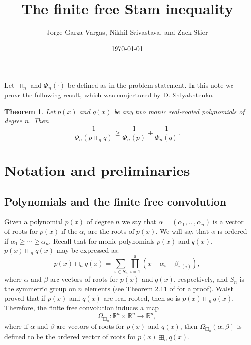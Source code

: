 \documentclass[12pt]{amsart}
\title{The finite free Stam inequality}
\author{Jorge Garza Vargas, Nikhil Srivastava, and  Zack Stier}
\date{\today}
\newcommand{\bR}{\mathbb{R}}
\newcommand{\roots}{\Omega_{\boxplus_n}}
\begin{document}
\maketitle


\newtheorem{theorem}{Theorem}[section]
\newtheorem{definition}{Definition}[section]
\newtheorem{conjecture}{Conjecture}[section]
\newtheorem{lemma}{Lemma}[section]
\newtheorem{corollary}{Corollary}[section]
\newtheorem{proposition}{Proposition}[section]
\newtheorem{observation}[theorem]{Observation}
\newtheorem{remark}{Remark}[section]
\newtheorem{problem}[theorem]{Problem}
\newtheorem{assumption}[theorem]{Assumption}
\newtheorem{claim}[theorem]{Claim}
\newtheorem{fact}[theorem]{Fact}
\newtheorem{example}[theorem]{Example}

\maketitle

Let $\boxplus_n$ and $\Phi_n(\cdot)$ be defined as in the problem statement.
In this note we prove the following result, which was conjectured by D. Shlyakhtenko.
\begin{theorem}
\label{thm:stamineq}
    Let $p(x)$ and $q(x)$ be any two monic real-rooted polynomials of degree $n$. Then 
    $$\frac{1}{\Phi_n(p\boxplus_n q)} \geq  \frac{1}{\Phi_n(p)} + \frac{1}{\Phi_n(q)}.$$
\end{theorem}

\section{Notation and preliminaries}
\subsection{Polynomials and the finite free convolution}

Given a polynomial $p(x)$ of degree $n$ we say that $\alpha=(\alpha_1, \dots, \alpha_n)$ is a vector of roots for $p(x)$ if the $\alpha_i$ are the roots of $p(x)$. We will say that $\alpha$ is ordered if $\alpha_1\geq \cdots \geq \alpha_n$.  Recall that for monic polynomials $p(x)$ and $q(x)$, $p(x)\boxplus_n q(x)$ may be expressed as:
\begin{equation}\label{eqn:convroots} p(x)\boxplus_n q(x) = \sum_{\pi\in S_n} \prod_{i=1}^n(x-\alpha_i-\beta_{\pi(i)}),\end{equation}
where $\alpha$ and $\beta$ are vectors of roots for $p(x)$ and $q(x)$, respectively, and $S_n$ is the symmetric group on $n$ elements (see Theorem 2.11 of \cite{marcus2022finite} for a proof). Walsh \cite{walsh1922location} proved that if $p(x)$ and $q(x)$ are real-rooted, then so is $p(x)\boxplus_n q(x)$. Therefore, the finite free convolution induces a map
$$\roots: \bR^{n}\times \bR^n \to \bR^n,$$
where if $\alpha$ and $\beta$ are vectors of roots for $p(x)$ and $q(x)$, then $\roots(\alpha, \beta)$ is defined to be the ordered vector of roots for $p(x)\boxplus_n q(x)$.  
\end{document}

